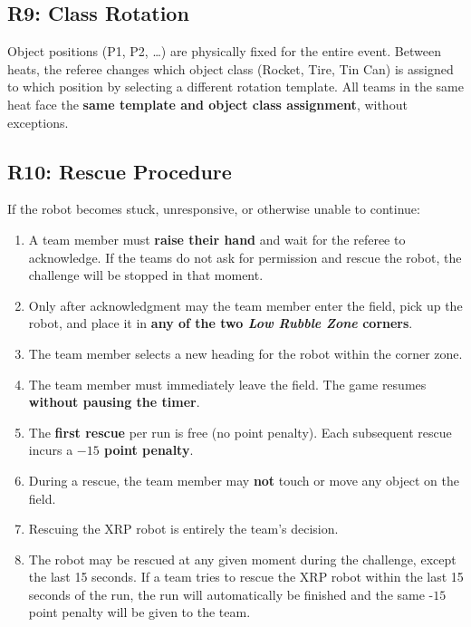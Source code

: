 \documentclass[a4]{article}
\begin{document}
\subsection*{R9: Class Rotation}
Object positions (P1, P2, \ldots) are physically fixed for the entire event. Between heats, the referee changes which object class (Rocket, Tire, Tin Can) is assigned to which position by selecting a different rotation template. All teams in the same heat face the \textbf{same template and object class assignment}, without exceptions.

\subsection*{R10: Rescue Procedure}
If the robot becomes stuck, unresponsive, or otherwise unable to continue:
\begin{enumerate}[label=\arabic*.]
    \item A team member must \textbf{raise their hand} and wait for the referee to acknowledge. If the teams do not ask for permission and rescue the robot, the challenge will be stopped in that moment.
    \item Only after acknowledgment may the team member enter the field, pick up the robot, and place it in \textbf{any of the two \textit{Low Rubble Zone} corners}. 
    \item The team member selects a new heading for the robot within the corner zone.
    \item The team member must immediately leave the field. The game resumes \textbf{without pausing the timer}.
    \item The \textbf{first rescue} per run is free (no point penalty). Each subsequent rescue incurs a \textbf{$-15$ point penalty}.
    \item During a rescue, the team member may \textbf{not} touch or move any object on the field.
    \item Rescuing the XRP robot is entirely the team's decision. 
    \item The robot may be rescued at any given moment during the challenge, except the last 15 seconds. If a team tries to rescue the XRP robot within the last 15 seconds of the run, the run will automatically be finished and the same -$15$ point penalty will be given to the team. 
\end{enumerate}
\end{document}
